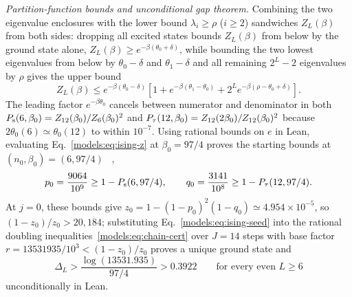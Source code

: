 \emph{Partition-function bounds and unconditional gap theorem.}
Combining the two eigenvalue enclosures with the lower bound
$\lambda_i\ge\rho$ ($i\ge2$) sandwiches $Z_L(\beta)$ from both sides:
dropping all excited states bounds $Z_L(\beta)$ from below by the ground
state alone, $Z_L(\beta)\ge e^{-\beta(\theta_0+\delta)}$, while bounding
the two lowest eigenvalues from below by $\theta_0-\delta$ and
$\theta_1-\delta$ and all remaining $2^L-2$ eigenvalues by $\rho$ gives
the upper bound%
~
\begin{equation}
    Z_L(\beta)\le e^{-\beta(\theta_0-\delta)}
    \left[1+e^{-\beta(\theta_1-\theta_0)}
        +2^Le^{-\beta(\rho-\theta_0+\delta)}\right].
    \label{models:eq:ising-z}
\end{equation}
The leading factor $e^{-\beta\theta_0}$ cancels between numerator and
denominator in both $P_{\mathrm s}(6,\beta_0)=Z_{12}(\beta_0)/Z_6(\beta_0)^2$ and
$P_{\tau}(12,\beta_0)=Z_{12}(2\beta_0)/Z_{12}(\beta_0)^2$ because
$2\theta_0(6)\simeq\theta_0(12)$ to within $10^{-7}$. Using rational
bounds on $e$ in Lean, evaluating Eq.~\eqref{models:eq:ising-z} at
$\beta_0=97/4$ proves the starting bounds at $(n_0,\beta_0)=(6,97/4)$%
~,
\begin{equation}
    p_0=\frac{9064}{10^9}\ge1-P_{\mathrm s}(6,97/4),\qquad
    q_0=\frac{3141}{10^8}\ge1-P_{\tau}(12,97/4).
    \label{models:eq:ising-seed}
\end{equation}
At $j=0$, these bounds give $z_0=1-(1-p_0)^2(1-q_0)\simeq4.954\times10^{-5}$,
so $(1-z_0)/z_0>20{,}184$; substituting Eq.~\eqref{models:eq:ising-seed}
into the rational doubling inequalities~\eqref{models:eq:chain-cert}
over $J=14$ steps with base factor $r=13531935/10^3<(1-z_0)/z_0$ proves
a unique ground state and%
~
\begin{equation}
    \boxed{
        \Delta_L>\frac{\log(13531.935)}{97/4}>0.3922
        \qquad\text{for every even }L\ge6
    }
    \label{models:eq:ising-gap}
\end{equation}
unconditionally in Lean.
